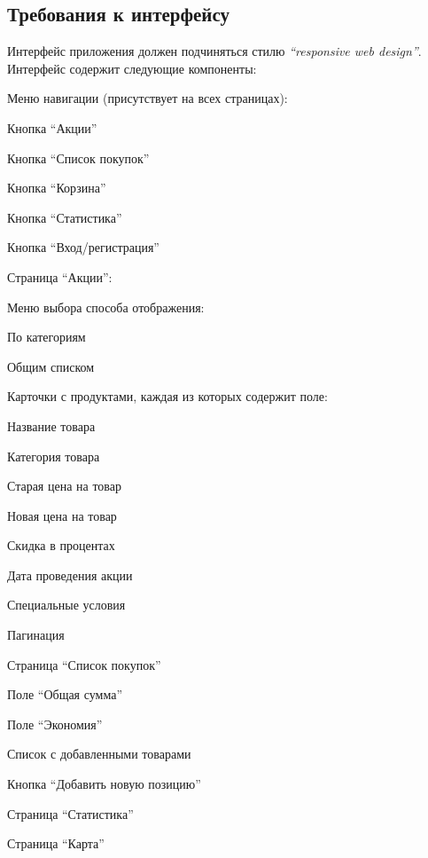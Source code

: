 \subsection{Требования к интерфейсу}
Интерфейс приложения должен подчиняться стилю \textit{``responsive web design''}.\\
Интерфейс содержит следующие компоненты:
\begin{my_enumerate}
  \item Меню навигации (присутствует на всех страницах):
  \begin{my_enumerate}
    \item Кнопка ``Акции''
    \item Кнопка ``Список покупок''
    \item Кнопка ``Корзина''
    \item Кнопка ``Статистика''
    \item Кнопка ``Вход/регистрация''
  \end{my_enumerate}
  \item Страница ``Акции'':
  \begin{my_enumerate}
    \item Меню выбора способа отображения:
    \begin{my_enumerate}
      \item По категориям
      \item Общим списком
    \end{my_enumerate}
    \item Карточки с продуктами, каждая из которых содержит поле:
    \begin{my_enumerate}
      \item Название товара
      \item Категория товара
      \item Старая цена на товар
      \item Новая цена на товар
      \item Скидка в процентах
      \item Дата проведения акции
      \item Специальные условия
    \end{my_enumerate}
    \item Пагинация
  \end{my_enumerate}
  \item Страница ``Список покупок''
  \begin{my_enumerate}
    \item Поле ``Общая сумма''
    \item Поле ``Экономия''
    \item Список с добавленными товарами
    \item Кнопка ``Добавить новую позицию''
  \end{my_enumerate}
  \item Страница ``Статистика''
  \item Страница ``Карта''
\end{my_enumerate}


